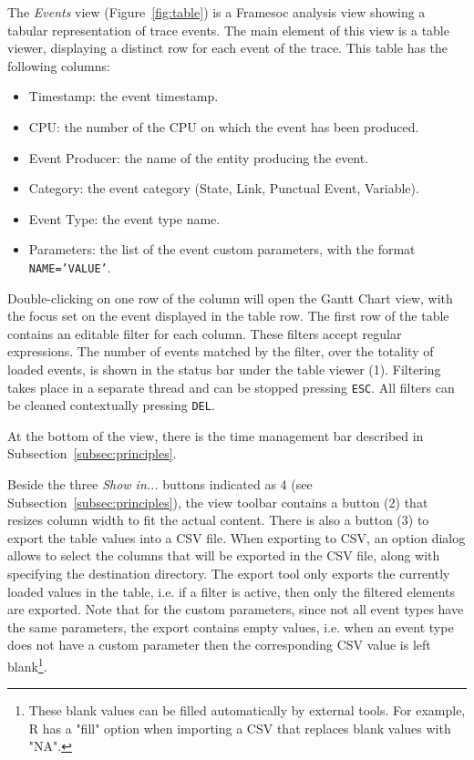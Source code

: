\documentclass[twoside]{article}
\begin{document}
\begin{sloppypar}
The \emph{Events} view (Figure~\ref{fig:table}) is a Framesoc analysis view showing a tabular representation of trace events.
The main element of this view is a table viewer, displaying a distinct row for each event of the trace.
This table has the following columns:
\begin{itemize}
 \item Timestamp: the event timestamp.
 \item CPU: the number of the CPU on which the event has been produced.
 \item Event Producer: the name of the entity producing the event.
 \item Category: the event category (State, Link, Punctual Event, Variable).
 \item Event Type: the event type name.
 \item Parameters: the list of the event custom parameters, with the format \texttt{NAME='VALUE'}.
\end{itemize}
Double-clicking on one row of the column will open the Gantt Chart view, with the focus set on the event displayed in the table row.
The first row of the table contains an editable filter for each column. 
These filters accept regular expressions.
The number of events matched by the filter, over the totality of loaded events, is shown in the status bar under the table viewer (\num{1}).
Filtering takes place in a separate thread and can be stopped pressing \texttt{ESC}. 
All filters can be cleaned contextually pressing \texttt{DEL}.

At the bottom of the view, there is the time management bar described in Subsection~\ref{subsec:principles}.

Beside the three \emph{Show in...} buttons indicated as \num{4} (see Subsection~\ref{subsec:principles}), the view toolbar contains a button (\num{2}) that resizes column width to fit the actual content. 
There is also a button (\num{3}) to export the table values into a CSV file.
When exporting to CSV, an option dialog allows to select the columns that will be exported in the CSV file, along with specifying the destination directory.
The export tool only exports the currently loaded values in the table, i.e. if a filter is active, then only the filtered elements are exported.
Note that for the custom parameters, since not all event types have the same parameters, the export contains empty values, i.e. when an event type does not have a custom parameter then the corresponding CSV value is left blank\footnote{These blank values can be filled automatically by external tools. For example, R has a "fill" option when importing a CSV that replaces blank values with "NA".}.


\end{sloppypar}
\end{document}
